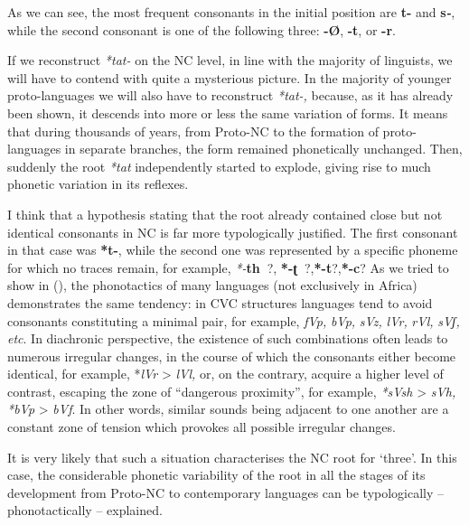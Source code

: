 As we can see, the most frequent consonants in the initial position are \textbf{t-} and \textbf{s\textit{-}}, while the second consonant is one of the following three: \textbf{-Ø}, \textbf{-t}, or \textbf{-r}.

If we reconstruct \textit{*tat-} on the NC level, in line with the majority of linguists, we will have to contend with quite a mysterious picture. In the majority of younger proto-languages we will also have to reconstruct \textit{*tat-,} because, as it has already been shown, it descends into more or less the same variation of forms. It means that during thousands of years, from Proto-NC to the formation of proto-languages in separate branches, the form remained phonetically unchanged. Then, suddenly the root \textit{*tat} independently started to explode, giving rise to much phonetic variation in its reflexes. 

I think that a hypothesis stating that the root already contained close but not identical consonants in NC is far more typologically justified. The first consonant in that case was \textbf{*t-}, while the second one was represented by a specific phoneme for which no traces remain, for example, \textit{*-}\textbf{th~}?, \textbf{*-ʈ~}?,\textbf{*-t{}}?,\textbf{*-c}? As we tried to show in (\citealt{PozdniakovSegerer2007}), the phonotactics of many languages (not exclusively in Africa) demonstrates the same tendency: in CVC structures languages tend to avoid consonants constituting a minimal pair, for example, \textit{fVp,} \textit{bVp,} \textit{sVz,} \textit{lVr,} \textit{rVl,} \textit{sVʃ,} \textit{etc}.  In diachronic perspective, the existence of such combinations often leads to numerous irregular changes, in the course of which the consonants either become identical, for example, *\textit{lVr} > \textit{lVl,} or, on the contrary, acquire a higher level of contrast, escaping the zone of “dangerous proximity”, for example, \textit{*sVsh} > \textit{sVh,} \textit{*bVp} > \textit{bVf}. In other words, similar sounds being adjacent to one another are a constant zone of tension which provokes all possible irregular changes.

It is very likely that such a situation characterises the NC root for ‘three’. In this case, the considerable phonetic variability of the root in all the stages of its development from Proto-NC to contemporary languages can be typologically – phonotactically – explained.

\clearpage
